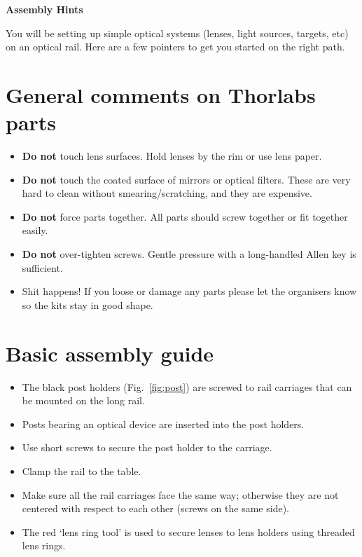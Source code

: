 \documentclass[a4paper]{report}
\begin{document}
	
	\setcounter{secnumdepth}{2}
	
	\begin{center}
		\textbf{\Large{Assembly Hints}}
	\end{center}
	
	You will be setting up simple optical systems (lenses, light sources, targets, etc) on an optical rail. 
	Here are a few pointers to get you started on the right path.
	

	\section{General comments on Thorlabs parts}
	
	\begin{itemize}
		\item \textbf{Do not} touch lens surfaces. Hold lenses by the rim or use lens paper.
		\item \textbf{Do not} touch the coated surface of mirrors or optical filters. These are very hard to clean without smearing/scratching, and they are expensive.
		\item \textbf{Do not} force parts together. All parts should screw together or fit together easily.
		\item \textbf{Do not} over-tighten screws. Gentle pressure with a long-handled Allen key is sufficient. 
		\item Shit happens! If you loose or damage any parts please let the organisers know so the kits stay in good shape.
	\end{itemize}
	
	\section{Basic assembly guide}
	
	\begin{itemize}
	\item The black post holders (Fig.~\ref{fig:post}) are screwed to rail carriages that can be mounted on the long rail.
	\item Posts bearing an optical device are inserted into the post holders. 
	\item Use short screws to secure the post holder to the carriage. 
	\item Clamp the rail to the table.
	\item  Make sure all the rail carriages face the same way; otherwise they are not centered with respect to each other (screws on the same side).
	\item The red `lens ring tool' is used to secure lenses to lens holders using threaded lens rings. 
	\end{itemize}
	
\end{document}
